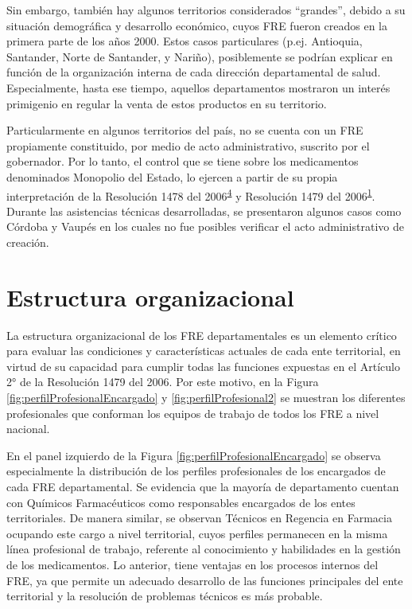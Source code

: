 \documentclass[
]{book}
\begin{document}
Sin embargo, también hay algunos territorios considerados ``grandes'', debido a su situación demográfica y desarrollo económico, cuyos FRE fueron creados en la primera parte de los años 2000. Estos casos particulares (p.ej. Antioquia, Santander, Norte de Santander, y Nariño), posiblemente se podrían explicar en función de la organización interna de cada dirección departamental de salud. Especialmente, hasta ese tiempo, aquellos departamentos mostraron un interés primigenio en regular la venta de estos productos en su territorio.

Particularmente en algunos territorios del país, no se cuenta con un FRE propiamente constituido, por medio de acto administrativo, suscrito por el gobernador. Por lo tanto, el control que se tiene sobre los medicamentos denominados Monopolio del Estado, lo ejercen a partir de su propia interpretación de la Resolución 1478 del 2006\textsuperscript{\protect\hyperlink{ref-MSPS1478-2006}{4}} y Resolución 1479 del 2006\textsuperscript{\protect\hyperlink{ref-MSPS1479-2006}{1}}. Durante las asistencias técnicas desarrolladas, se presentaron algunos casos como Córdoba y Vaupés en los cuales no fue posibles verificar el acto administrativo de creación.

\hypertarget{estructura-organizacional}{%
\section{Estructura organizacional}\label{estructura-organizacional}}

La estructura organizacional de los FRE departamentales es un elemento crítico para evaluar las condiciones y características actuales de cada ente territorial, en virtud de su capacidad para cumplir todas las funciones expuestas en el Artículo 2° de la Resolución 1479 del 2006. Por este motivo, en la Figura \ref{fig:perfilProfesionalEncargado} y \ref{fig:perfilProfesional2} se muestran los diferentes profesionales que conforman los equipos de trabajo de todos los FRE a nivel nacional.

En el panel izquierdo de la Figura \ref{fig:perfilProfesionalEncargado} se observa especialmente la distribución de los perfiles profesionales de los encargados de cada FRE departamental. Se evidencia que la mayoría de departamento cuentan con Químicos Farmacéuticos como responsables encargados de los entes territoriales. De manera similar, se observan Técnicos en Regencia en Farmacia ocupando este cargo a nivel territorial, cuyos perfiles permanecen en la misma línea profesional de trabajo, referente al conocimiento y habilidades en la gestión de los medicamentos. Lo anterior, tiene ventajas en los procesos internos del FRE, ya que permite un adecuado desarrollo de las funciones principales del ente territorial y la resolución de problemas técnicos es más probable.
\end{document}

